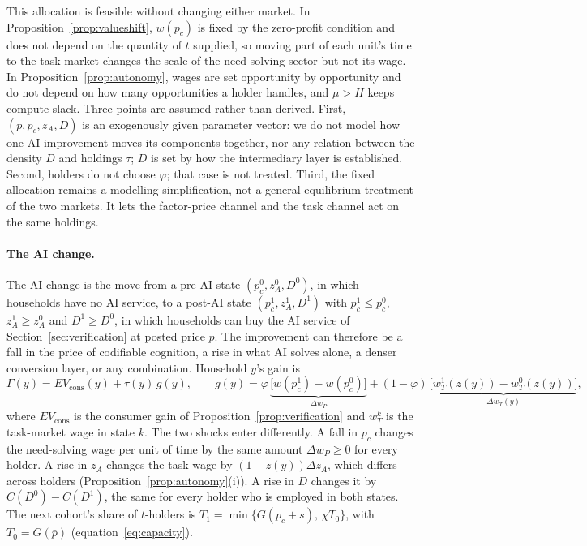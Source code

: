 \documentclass[12pt]{article}
\theoremstyle{remark}
\begin{document}
This allocation is feasible without changing either market. In Proposition~\ref{prop:valueshift}, $w(p_c)$ is fixed by the zero-profit condition and does not depend on the quantity of $t$ supplied, so moving part of each unit's time to the task market changes the scale of the need-solving sector but not its wage. In Proposition~\ref{prop:autonomy}, wages are set opportunity by opportunity and do not depend on how many opportunities a holder handles, and $\mu>H$ keeps compute slack. Three points are assumed rather than derived. First, $(p,p_c,z_A,D)$ is an exogenously given parameter vector: we do not model how one AI improvement moves its components together, nor any relation between the density $D$ and holdings $\tau$; $D$ is set by how the intermediary layer is established. Second, holders do not choose $\varphi$; that case is not treated. Third, the fixed allocation remains a modelling simplification, not a general-equilibrium treatment of the two markets. It lets the factor-price channel and the task channel act on the same holdings.

\paragraph{The AI change.} The AI change is the move from a pre-AI state $(p_c^0,z_A^0,D^0)$, in which households have no AI service, to a post-AI state $(p_c^1,z_A^1,D^1)$ with $p_c^1\le p_c^0$, $z_A^1\ge z_A^0$ and $D^1\ge D^0$, in which households can buy the AI service of Section~\ref{sec:verification} at posted price $p$. The improvement can therefore be a fall in the price of codifiable cognition, a rise in what AI solves alone, a denser conversion layer, or any combination. Household $y$'s gain is
\begin{equation}\label{eq:G}
\Gamma(y)=EV_{\text{cons}}(y)+\tau(y)\,g(y),\qquad g(y)=\varphi\,\underbrace{\big[w(p_c^1)-w(p_c^0)\big]}_{\Delta w_P}+(1-\varphi)\,\underbrace{\big[w_T^1(z(y))-w_T^0(z(y))\big]}_{\Delta w_T(y)},
\end{equation}
where $EV_{\text{cons}}$ is the consumer gain of Proposition~\ref{prop:verification} and $w_T^k$ is the task-market wage in state $k$. The two shocks enter differently. A fall in $p_c$ changes the need-solving wage per unit of time by the same amount $\Delta w_P\ge0$ for every holder. A rise in $z_A$ changes the task wage by $(1-z(y))\Delta z_A$, which differs across holders (Proposition~\ref{prop:autonomy}(i)). A rise in $D$ changes it by $C(D^0)-C(D^1)$, the same for every holder who is employed in both states. The next cohort's share of $t$-holders is $T_1=\min\{G(p_c+s),\,\chi T_0\}$, with $T_0=G(\bar p)$ (equation~\eqref{eq:capacity}).
\end{document}
